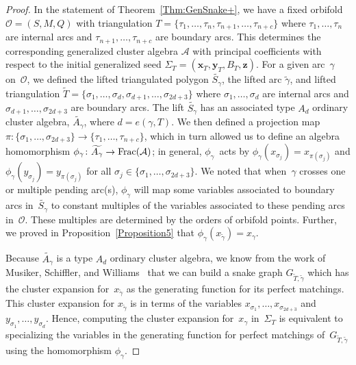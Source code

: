 \documentclass[pdftex]{sigma}%
\numberwithin{equation}{section}
\begin{document}
\begin{proof} In the statement of Theorem~\ref{Thm:GenSnake+}, we have a fixed orbifold $\mathcal{O} = (S,M,Q)$ with triangulation $T = \{\tau_1,\dots,\tau_n,\tau_{n+1},\dots,\tau_{n+c} \}$ where $\tau_1,\dots,\tau_n$ are internal arcs and $\tau_{n+1},\dots,\tau_{n+c}$ are boundary arcs. This determines the corresponding generalized cluster algebra $\mathcal{A}$ with principal coefficients with respect to the initial generalized seed $\Sigma_T = (\mathbf{x}_T,\mathbf{y}_T,B_T,\mathbf{z})$. For a given arc~$\gamma$ on~$\mathcal{O}$, we defined the lifted triangulated polygon $\widetilde{S_{\gamma}}$, the lifted arc $\widetilde{\gamma}$, and lifted triangulation $\widetilde{T} = \{\sigma_1, \dots, \sigma_d, \sigma_{d+1}, \dots, \sigma_{2d+3} \}$ where $\sigma_1,\dots,\sigma_d$ are internal arcs and $\sigma_{d+1},\dots,\sigma_{2d+3}$ are boundary arcs. The lift $\widetilde{S_\gamma}$ has an associated type $A_d$ ordinary cluster algebra, $\widetilde{A_\gamma}$, where $d = e(\gamma,T)$. We then defined a projection map $\pi\colon \{ \sigma_1,\dots,\sigma_{2d+3} \} \rightarrow \{ \tau_1,\dots,\tau_{n+c} \}$, which in turn allowed us to define an algebra homomorphism $\phi_\gamma\colon \widetilde{A_\gamma} \rightarrow {\rm Frac}(\mathcal{A})$; in general, $\phi_\gamma$~acts by $\phi_\gamma(x_{\sigma_j}) = x_{\pi(\sigma_{j})}$ and $\phi_\gamma(y_{\sigma_j}) = y_{\pi(\sigma_{j})}$ for all $\sigma_j \in \{\sigma_1, \dots, \sigma_{2d+3} \}$. We noted that when~$\gamma$ crosses one or multiple pending arc(s), $\phi_\gamma$ will map some variables associated to boundary arcs in~$\widetilde{S_\gamma}$ to constant multiples of the variables associated to these pending arcs in~$\mathcal{O}$. These multiples are determined by the orders of orbifold points.
Further, we proved in Proposition~\ref{Proposition5} that $\phi_\gamma(x_{\widetilde{\gamma}}) = x_{\gamma}$.

Because $\widetilde{A_\gamma}$ is a type $A_d$ ordinary cluster algebra, we know from the work of Musiker, Schiffler, and Williams~\cite{MSW} that we can build a snake graph $G_{\widetilde{T},\widetilde{\gamma}}$ which has the cluster expansion for~$x_{\widetilde{\gamma}}$ as the generating function for its perfect matchings. This cluster expansion for $x_{\widetilde{\gamma}}$ is in terms of the variables $x_{\sigma_1}, \dots, x_{\sigma_{2d+3}}$ and $y_{\sigma_1},\dots, y_{\sigma_{d}}$. Hence, computing the cluster expansion for~$x_\gamma$ in~$\Sigma_T$ is equivalent to specializing the variables in the generating function for perfect matchings of~$G_{\widetilde{T},\widetilde{\gamma}}$ using the homomorphism $\phi_\gamma$.


\end{proof}
\end{document}

